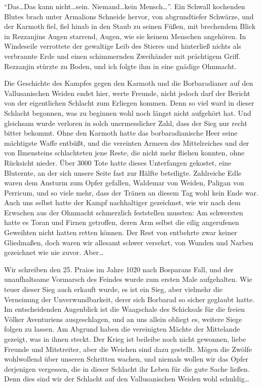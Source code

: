 ``Das\dots Das kann nicht\dots sein. Niemand\dots kein Mensch\dots''. Ein Schwall kochenden Blutes brach unter Armalions Schneide hervor, von abgrundtiefer Schwärze, und der Karmoth fiel, fiel hinab in den Staub zu seinen Füßen, mit brechendem Blick in Rezzanjins Augen starrend, Augen, wie sie keinem Menschen angehören. In Windeseile verrottete der gewaltige Leib des Stieres und hinterließ nichts als verbrannte Erde und einen schimmernden Zweihänder mit prächtigem Griff. Rezzanjin stürzte zu Boden, und ich folgte ihm in eine gnädige Ohnmacht.

Die Geschichte des Kampfes gegen den Karmoth und die Borbaradianer auf den Vallusanischen Weiden endet hier, werte Freunde, nicht jedoch darf der Bericht von der eigentlichen Schlacht zum Erliegen kommen. Denn so viel ward in dieser Schlacht begonnen, was zu beginnen wohl noch längst nicht aufgehört hat. Und gleichsam wurde verloren in solch unermesslicher Zahl, dass der Sieg nur recht bitter bekommt. Ohne den Karmoth hatte das borbaradianische Heer seine mächtigste Waffe entbüßt, und die vereinten Armeen des Mittelreiches und der von Ilmensteins schlachteten jene Reste, die nicht mehr fliehen konnten, ohne Rücksicht nieder. Über 3000 Tote hatte dieses Unterfangen gekostet, eine Bluternte, an der sich unsere Seite fast zur Hälfte beteiligte. Zahlreiche Edle waren dem Ansturm zum Opfer gefallen, Waldemar von Weiden, Paligan von Perricum, und so viele mehr, dass der Tränen an diesem Tag wohl kein Ende war. Auch uns selbst hatte der Kampf nachhaltiger gezeichnet, wie wir nach dem Erwachen aus der Ohnmacht schmerzlich feststellen mussten: Am schwersten hatte es Toran und Firnen getroffen, deren Arm selbst die eilig angerufenen Geweihten nicht hatten retten können. Der Rest von entbehrte zwar keiner Gliedmaßen, doch waren wir allesamt schwer versehrt, von Wunden und Narben gezeichnet wie nie zuvor. Aber\dots

Wir schreiben den 25. Praios im Jahre 1020 nach Bosparans Fall, und der unaufhaltsame Vormarsch des Feindes wurde zum ersten Male aufgehalten. Wie teuer dieser Sieg auch erkauft wurde, es ist ein Sieg, aber vielmehr die Verneinung der Unverwundbarkeit, derer sich Borbarad so sicher geglaubt hatte. Im entscheidenden Augenblick ist die Waagschale des Schicksals für die freien Völker Aventuriens ausgeschlagen, und an uns allein obliegt es, weitere Siege folgen zu lassen. Am Abgrund haben die vereinigten Mächte der Mittelande gezeigt, was in ihnen steckt. Der Krieg ist beileibe noch nicht gewonnen, liebe Freunde und Mitstreiter, aber die Weichen sind dazu gestellt. Mögen die Zwölfe wohlwollend über unseren Schritten wachen, und niemals wollen wir das Opfer derjenigen vergessen, die in dieser Schlacht ihr Leben für die gute Sache ließen. Denn dies sind wir der Schlacht auf den Vallusanischen Weiden wohl schuldig\dots


